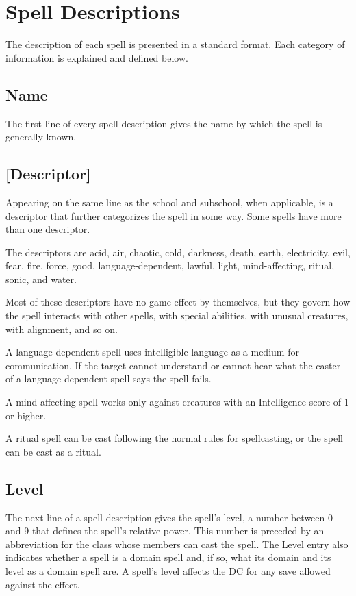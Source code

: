 \section{Spell Descriptions}
The description of each spell is presented in a standard format. Each category of information is explained and defined below.


\subsection{Name}
The first line of every spell description gives the name by which the spell is generally known.




\subsection{[Descriptor]}
Appearing on the same line as the school and subschool, when applicable, is a descriptor that further categorizes the spell in some way. Some spells have more than one descriptor.

The descriptors are acid, air, chaotic, cold, darkness, death, earth, electricity, evil, fear, fire, force, good, language-dependent, lawful, light, mind-affecting, ritual, sonic, and water.

Most of these descriptors have no game effect by themselves, but they govern how the spell interacts with other spells, with special abilities, with unusual creatures, with alignment, and so on.

A language-dependent spell uses intelligible language as a medium for communication. If the target cannot understand or cannot hear what the caster of a language-dependent spell says the spell fails.

A mind-affecting spell works only against creatures with an Intelligence score of 1 or higher.

A ritual spell can be cast following the normal rules for spellcasting, or the spell can be cast as a ritual.


\subsection{Level}
The next line of a spell description gives the spell's level, a number between 0 and 9 that defines the spell's relative power. This number is preceded by an abbreviation for the class whose members can cast the spell. The Level entry also indicates whether a spell is a domain spell and, if so, what its domain and its level as a domain spell are. A spell's level affects the DC for any save allowed against the effect.

